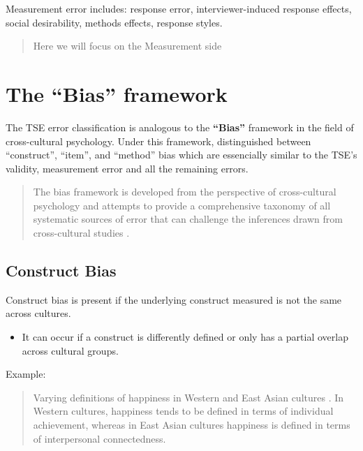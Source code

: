 \documentclass[
]{book}
\providecommand{\tightlist}{%
  \setlength{\itemsep}{0pt}\setlength{\parskip}{0pt}}
\begin{document}
Measurement error includes: response error, interviewer-induced response effects, social desirability, methods effects, response styles.

\begin{quote}
Here we will focus on the Measurement side
\end{quote}

\hypertarget{the-bias-framework}{%
\section{The ``Bias'' framework}\label{the-bias-framework}}

The TSE error classification is analogous to the \textbf{``Bias''} framework in the field of cross-cultural psychology. Under this framework, \citet{VandeVijver1997} distinguished between ``construct'', ``item'', and ``method'' bias which are essencially similar to the TSE's validity, measurement error and all the remaining errors.

\begin{quote}
The bias framework is developed from the perspective of cross-cultural psychology and attempts to provide a comprehensive taxonomy of all systematic sources of error that can challenge the inferences drawn from cross-cultural studies \citep{VandeVijver1997, VandeVijver2000, VandeVijver1997a, VandeVijver2004}.
\end{quote}

\hypertarget{construct-bias}{%
\subsection{Construct Bias}\label{construct-bias}}

Construct bias is present if the underlying construct measured is not the same across cultures.

\begin{itemize}
\tightlist
\item
  It can occur if a construct is differently defined or only has a partial overlap across cultural groups.
\end{itemize}

Example:

\begin{quote}
Varying definitions of happiness in Western and East Asian cultures \citep{Uchida2004}. In Western cultures, happiness tends to be defined in terms of individual achievement, whereas in East Asian cultures happiness is defined in terms of interpersonal connectedness.
\end{quote}
\end{document}

